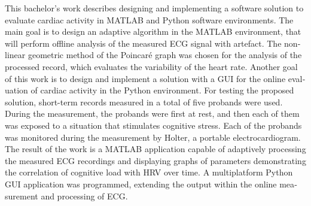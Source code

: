 \begin{otherlanguage}{english}
This bachelor's work describes designing and implementing a software
solution to evaluate cardiac activity in MATLAB and Python
software environments. The main goal is to design an adaptive algorithm in the
MATLAB environment, that will perform offline analysis of the
measured ECG signal with artefact. The nonlinear geometric method of the
Poincaré graph was chosen for the analysis of the processed record, which
evaluates the variability of the heart rate. Another goal of this work is to
design and implement a solution with a GUI for the online evaluation of cardiac
activity in the Python environment. For testing the proposed solution,
short-term records measured in a total of five probands were used. During the
measurement, the probands were first at rest, and then each of them was exposed
to a situation that stimulates cognitive stress. Each of the probands was
monitored during the measurement by Holter, a portable electrocardiogram. The
result of the work is a MATLAB application capable of adaptively processing the
measured ECG recordings and displaying graphs of parameters demonstrating the
correlation of cognitive load with HRV over time. A
multiplatform Python GUI application was programmed, extending the output within
the online measurement and processing of ECG. 
\end{otherlanguage}